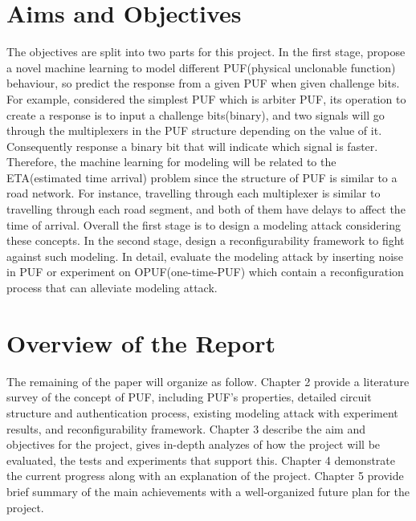 \section{Aims and Objectives}
The objectives are split into two parts for this project. In the first stage, propose a novel machine learning to model different PUF(physical unclonable function)
behaviour, so predict the response from a given PUF when given challenge bits. For example, considered the simplest PUF which is arbiter PUF, its operation to create a response is to
input a challenge bits(binary), and two signals will go through the multiplexers in the PUF structure depending on the value of it. Consequently response a binary bit
that will indicate which signal is faster. Therefore, the machine learning for modeling will be related to the ETA(estimated time arrival) problem since the structure of PUF is similar to a road network. 
For instance, travelling through each multiplexer is similar to travelling through each road segment, and both of them have delays to affect the time of arrival. Overall the first stage is to design a modeling attack
considering these concepts. In the second stage, design a reconfigurability framework to fight against such modeling. In detail, evaluate the modeling attack by inserting noise in PUF or experiment on OPUF(one-time-PUF) which
contain a reconfiguration process that can alleviate modeling attack.

\section{Overview of the Report}
The remaining of the paper will organize as follow. Chapter 2 provide a literature survey of the concept of PUF, including PUF's properties, detailed circuit structure and authentication process, 
existing modeling attack with experiment results, and reconfigurability framework. Chapter 3 describe the aim and objectives for the project, gives in-depth analyzes of how the project will be evaluated, 
the tests and experiments that support this. Chapter 4 demonstrate the current progress along with an explanation of the project. Chapter 5 provide brief summary of the main achievements with a well-organized future plan for the project.
